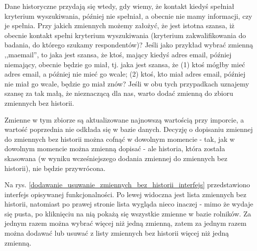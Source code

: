 \documentclass[12pt, twoside, hidelinks]{report}
\begin{document}
Dane historyczne przydają się wtedy, gdy wiemy, że kontakt kiedyś spełniał kryterium wyszukiwania, później nie spełniał, a obecnie nie mamy informacji, czy je spełnia. Przy jakich zmiennych możemy założyć, że jest istotna szansa, iż obecnie kontakt spełni kryterium wyszukiwania (kryterium zakwalifikowania do badania, do którego szukamy respondentów)? Jeśli jako przykład wybrać zmienną ,,ma\textunderscore email'', to jaka jest szansa, że ktoś, mający kiedyś adres email, później niemający, obecnie będzie go miał, tj. jaka jest szansa, że (1) ktoś mógłby mieć adres email, a później nie mieć go wcale; (2) ktoś, kto miał adres email, później nie miał go wcale, będzie go miał znów? Jeśli w obu tych przypadkach uznajemy szansę za tak małą, że nieznaczącą dla nas, warto dodać zmienną do zbioru zmiennych bez historii. \par
Zmienne w tym zbiorze są aktualizowane najnowszą wartością przy imporcie, a wartość poprzednia nie odkłada się w bazie danych. Decyzję o dopisaniu zmiennej do zmiennych bez historii można cofnąć w dowolnym momencie - tak, jak w dowolnym momencie można zmienną dopisać - ale historia, która została skasowana (w wyniku wcześniejszego dodania zmiennej do zmiennych bez historii), nie będzie przywrócona. \par
Na rys. \ref{dodawanie_usuwanie_zmiennych_bez_historii_interfejs} przedstawiono interfejs opisywanej funkcjonalności. Po lewej widoczna jest lista zmiennych bez historii, natomiast po prawej stronie lista wygląda nieco inaczej - mimo że wydaje się pusta, po kliknięciu na nią pokażą się wszystkie zmienne w bazie rolników. Za jednym razem można wybrać więcej niż jedną zmienną, zatem za jednym razem można dodawać lub usuwać z listy zmiennych bez historii więcej niż jedną zmienną.
\end{document}
